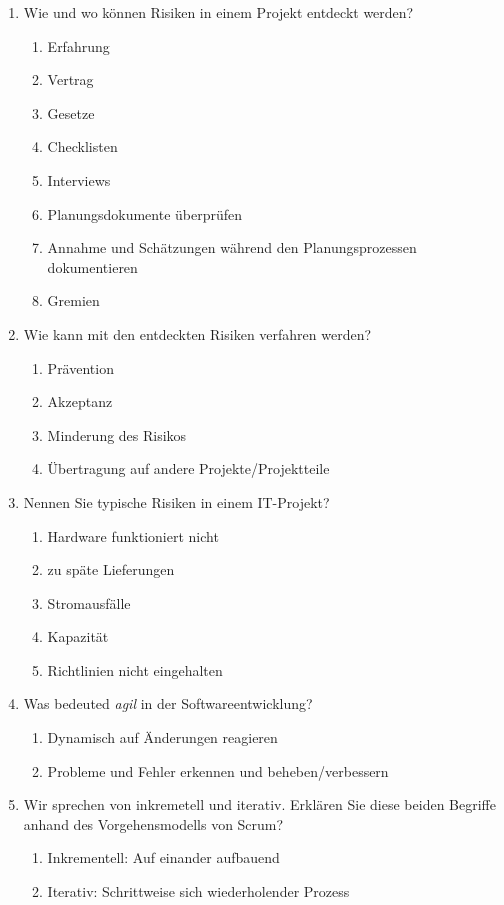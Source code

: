 \documentclass[12pt,a4paper]{article}
\begin{document}
\begin{enumerate}
	\item Wie und wo können Risiken in einem Projekt entdeckt werden?
	\begin{enumerate}
		\item Erfahrung
		\item Vertrag
		\item Gesetze
		\item Checklisten
		\item Interviews
		\item Planungsdokumente überprüfen
		\item Annahme und Schätzungen während den Planungsprozessen dokumentieren
		\item Gremien
	\end{enumerate}
	\item Wie kann mit den entdeckten Risiken verfahren werden?
	\begin{enumerate}
		\item Prävention
		\item Akzeptanz
		\item Minderung des Risikos
		\item Übertragung auf andere Projekte/Projektteile
	\end{enumerate}
	\item Nennen Sie typische Risiken in einem IT-Projekt?
	\begin{enumerate}
		\item Hardware funktioniert nicht
		\item zu späte Lieferungen
		\item Stromausfälle
		\item Kapazität
		\item Richtlinien nicht eingehalten
	\end{enumerate}
	\item Was bedeuted \textit{agil} in der Softwareentwicklung?
	\begin{enumerate}
		\item Dynamisch auf Änderungen reagieren
		\item Probleme und Fehler erkennen und beheben/verbessern
	\end{enumerate}
	\item Wir sprechen von inkremetell und iterativ. Erklären Sie diese beiden Begriffe anhand des Vorgehensmodells von Scrum?
	\begin{enumerate}
		\item Inkrementell: Auf einander aufbauend
		\item Iterativ: Schrittweise sich wiederholender Prozess

\end{enumerate}
\end{enumerate}
\end{document}
